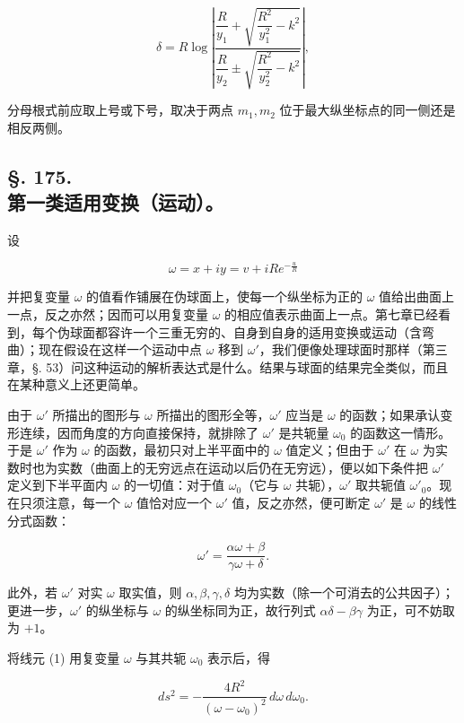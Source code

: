 \[
 \delta=R\log
 \left|
 \frac{\dfrac R{y_1}+\sqrt{\dfrac{R^2}{y_1^2}-k^2}}
 {\dfrac R{y_2}\pm\sqrt{\dfrac{R^2}{y_2^2}-k^2}}
 \right|,
\]

分母根式前应取上号或下号，取决于两点 \(m_1,m_2\) 位于最大纵坐标点的同一侧还是相反两侧。



\subsection*{§. 175.\\ 第一类适用变换（运动）。}



设

\[
 \omega=x+iy=v+iRe^{-\frac{u}{R}}
\]

并把复变量 \(\omega\) 的值看作铺展在伪球面上，使每一个纵坐标为正的 \(\omega\) 值给出曲面上一点，反之亦然；因而可以用复变量 \(\omega\) 的相应值表示曲面上一点。第七章已经看到，每个伪球面都容许一个三重无穷的、自身到自身的适用变换或运动（含弯曲）；现在假设在这样一个运动中点 \(\omega\) 移到 \(\omega'\)，我们便像处理球面时那样（第三章，§. 53）问这种运动的解析表达式是什么。结果与球面的结果完全类似，而且在某种意义上还更简单。



由于 \(\omega'\) 所描出的图形与 \(\omega\) 所描出的图形全等，\(\omega'\) 应当是 \(\omega\) 的函数；如果承认变形连续，因而角度的方向直接保持，就排除了 \(\omega'\) 是共轭量 \(\omega_0\) 的函数这一情形。于是 \(\omega'\) 作为 \(\omega\) 的函数，最初只对上半平面中的 \(\omega\) 值定义；但由于 \(\omega'\) 在 \(\omega\) 为实数时也为实数（曲面上的无穷远点在运动以后仍在无穷远），便以如下条件把 \(\omega'\) 定义到下半平面内 \(\omega\) 的一切值：对于值 \(\omega_0\)（它与 \(\omega\) 共轭），\(\omega'\) 取共轭值 \(\omega'_0\)。现在只须注意，每一个 \(\omega\) 值恰对应一个 \(\omega'\) 值，反之亦然，便可断定 \(\omega'\) 是 \(\omega\) 的线性分式函数：

\[
\tag{5}
 \omega'=\frac{\alpha\omega+\beta}{\gamma\omega+\delta}.
\]

此外，若 $\omega'$ 对实 $\omega$ 取实值，则 $\alpha,\beta,\gamma,\delta$ 均为实数（除一个可消去的公共因子）；更进一步，$\omega'$ 的纵坐标与 $\omega$ 的纵坐标同为正，故行列式 $\alpha\delta-\beta\gamma$ 为正，可不妨取为 $+1$。



将线元 (1) 用复变量 $\omega$ 与其共轭 $\omega_0$ 表示后，得

\[
\tag{5*}
 ds^2=-\frac{4R^2}{(\omega-\omega_0)^2}\,d\omega\,d\omega_0.
\]

